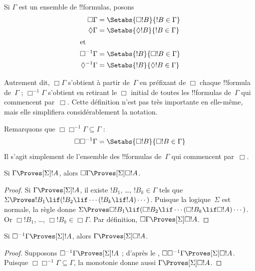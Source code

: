 \documentclass[../../../include/open-logic-section]{subfiles}
\begin{document}
\begin{defn}
  Si $\Gamma$ est un ensemble de !!{formula}s, posons
  \begin{align*}
    \Box\Gamma & = \Setabs{\Box !B}{!B \in \Gamma}\\
    \Diamond\Gamma & = \Setabs{\Diamond !B}{!B \in \Gamma}\\
    \intertext{et}
    \Box^{-1}\Gamma & = \Setabs{!B}{\Box !B \in \Gamma}\\
    \Diamond^{-1}\Gamma & = \Setabs{!B}{\Diamond !B \in \Gamma}\\
  \end{align*}
\end{defn}

Autrement dit, $\Box\Gamma$ s'obtient à partir de~$\Gamma$ en préfixant de $\Box$ chaque
!!{formula} de~$\Gamma$ ; $\Box^{-1}\Gamma$ s'obtient en retirant le
$\Box$ initial de toutes les !!{formula}s de~$\Gamma$ qui commencent
par~$\Box$. Cette définition n'est pas très importante en elle-même, mais elle
simplifiera considérablement la notation.

Remarquons que $\Box\Box^{-1}\Gamma \subseteq \Gamma$ :
\[
\Box\Box^{-1}\Gamma = \Setabs{\Box!B}{\Box!B \in \Gamma}
\]
Il s'agit simplement de l'ensemble des !!{formula}s de~$\Gamma$ qui
commencent par~$\Box$.

\begin{lem}
  Si $\Gamma \Proves[\Sigma] !A$, alors $\Box\Gamma \Proves[\Sigma] \Box
  !A$.
\end{lem}

\begin{proof}
  Si $\Gamma \Proves[\Sigma] !A$, il existe $!B_1$, \dots, $!B_k
  \in \Gamma$ tels que $\Sigma \Proves !B_1 \lif (!B_2 \lif \cdots
  (!B_k \lif !A)\cdots)$. Puisque la logique~$\Sigma$ est normale, la règle \RK{}
  donne $\Sigma \Proves \Box!B_1 \lif (\Box!B_2 \lif \cdots (\Box!B_k \lif
  \Box!A)\cdots)$. Or $\Box!B_1$, \dots, $\Box!B_k \in
  \Box\Gamma$. Par définition, $\Box\Gamma \Proves[\Sigma] \Box
  !A$.
\end{proof}

\begin{lem}
  Si $\Box^{-1} \Gamma \Proves[\Sigma] !A$, alors $\Gamma
  \Proves[\Sigma] \Box!A$.
\end{lem}

\begin{proof}
  Supposons $\Box^{-1}\Gamma \Proves[\Sigma] !A$ ; d'après le
  , $\Box\Box^{-1}\Gamma \Proves[\Sigma] \Box!A$.
  Puisque $\Box\Box^{-1}\Gamma \subseteq \Gamma$, la monotonie donne
  aussi $\Gamma \Proves[\Sigma] \Box!A$.
\end{proof}
\end{document}
